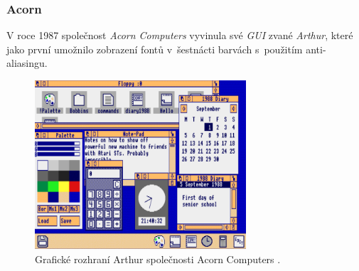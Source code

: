 \documentclass[11pt,twoside,a4paper]{book}
\begin{document}
\subsubsection{Acorn}
V roce 1987 společnost \textit{Acorn Computers} vyvinula své \textit{GUI} zvané \textit{Arthur}, které jako první umožnilo zobrazení fontů v~šestnácti barvách s~použitím anti-aliasingu.
\begin{figure}[!ht]
\begin{center}
  \includegraphics[width=0.7\textwidth]{figures/arthur}
\caption{{\label{fig:arthurGUI}}Grafické rozhraní Arthur společnosti Acorn Computers \cite{bib:arthurImage}.}
\end{center}
\end{figure}
\end{document}
